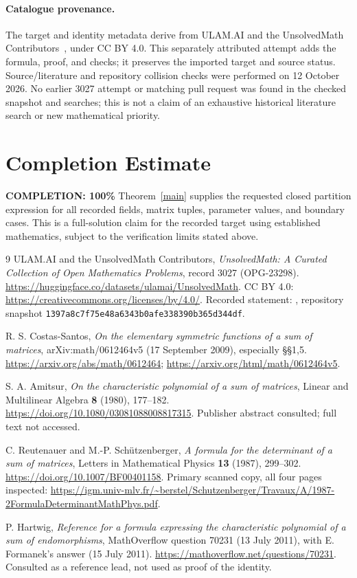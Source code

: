 \documentclass[11pt]{article}
\begin{document}
\paragraph{Catalogue provenance.}
The target and identity metadata derive from ULAM.AI and the UnsolvedMath
Contributors~\cite{catalogue}, under CC BY 4.0. This separately attributed
attempt adds the formula, proof, and checks; it preserves the imported
target and source status. Source/literature and repository collision checks
were performed on 12 October 2026. No earlier 3027 attempt or matching pull
request was found in the checked snapshot and searches; this is not a claim
of an exhaustive historical literature search or new mathematical priority.

\section{Completion Estimate}
\noindent\textbf{COMPLETION: 100\%}
Theorem~\ref{main} supplies the requested closed partition expression for
all recorded fields, matrix tuples, parameter values, and boundary cases.
This is a full-solution claim for the recorded target using established
mathematics, subject to the verification limits stated above.

\begin{thebibliography}{9}
ULAM.AI and the UnsolvedMath Contributors,
\emph{UnsolvedMath: A Curated Collection of Open Mathematics Problems},
record 3027 (OPG-23298).
\url{https://huggingface.co/datasets/ulamai/UnsolvedMath}.
CC BY 4.0: \url{https://creativecommons.org/licenses/by/4.0/}.
Recorded statement: ,
repository snapshot \texttt{1397a8c7f75e48a6343b0afe338390b365d344df}.

R. S. Costas-Santos,
\emph{On the elementary symmetric functions of a sum of matrices},
arXiv:math/0612464v5 (17 September 2009), especially \S\S1,5.
\url{https://arxiv.org/abs/math/0612464};
\url{https://arxiv.org/html/math/0612464v5}.

S. A. Amitsur,
\emph{On the characteristic polynomial of a sum of matrices},
Linear and Multilinear Algebra \textbf{8} (1980), 177--182.
\url{https://doi.org/10.1080/03081088008817315}.
Publisher abstract consulted; full text not accessed.

C. Reutenauer and M.-P. Sch\"utzenberger,
\emph{A formula for the determinant of a sum of matrices},
Letters in Mathematical Physics \textbf{13} (1987), 299--302.
\url{https://doi.org/10.1007/BF00401158}.
Primary scanned copy, all four pages inspected:
\url{https://igm.univ-mlv.fr/~berstel/Schutzenberger/Travaux/A/1987-2FormulaDeterminantMathPhys.pdf}.

P. Hartwig, \emph{Reference for a formula expressing the characteristic
polynomial of a sum of endomorphisms}, MathOverflow question 70231
(13 July 2011), with E. Formanek's answer (15 July 2011).
\url{https://mathoverflow.net/questions/70231}.
Consulted as a reference lead, not used as proof of the identity.
\end{thebibliography}
\end{document}
